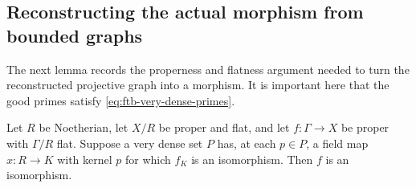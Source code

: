 \subsection{Reconstructing the actual morphism from bounded graphs}
\label{subsec:ftb-bounded-graph-reconstruction}

The next lemma records the properness and flatness argument needed
to turn the reconstructed projective graph into a morphism.
It is important here that the good primes satisfy
\eqref{eq:ftb-very-dense-primes}.

\begin{srlemma}
\label{lem:ftb-proper-flat-good-fibre-iso}
Let \(R\) be Noetherian, let \(X/R\) be proper and flat, and
let \(f:\Gamma\to X\) be proper with \(\Gamma/R\) flat.
Suppose a very dense set \(P\) has, at each \(p\in P\),
a field map \(x:R\to K\) with kernel \(p\) for which
\(f_K\) is an isomorphism.
Then \(f\) is an isomorphism.
\end{srlemma}
